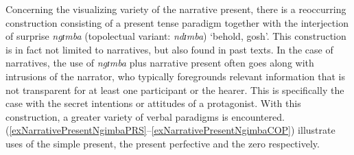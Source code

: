 Concerning the visualizing variety of the narrative present, there is a reoccurring construction consisting of a present tense paradigm together with the interjection of surprise \textit{ngɪmba} (topolectual variant: \textit{ndɪmba}) `behold, gosh'. This construction is in fact not limited to narratives, but also found in past  texts. In the case of narratives, the use of \textit{ngɪmba} plus narrative present often goes along with intrusions of the narrator, who typically foregrounds relevant information that is not transparent for at least one participant or the hearer. This is specifically the case with the secret intentions or attitudes of a protagonist. With this construction, a greater variety of verbal paradigms is encountered. (\ref{exNarrativePresentNgimbaPRS}--\ref{exNarrativePresentNgimbaCOP}) illustrate uses of the simple present, the present perfective and the zero  respectively.  

